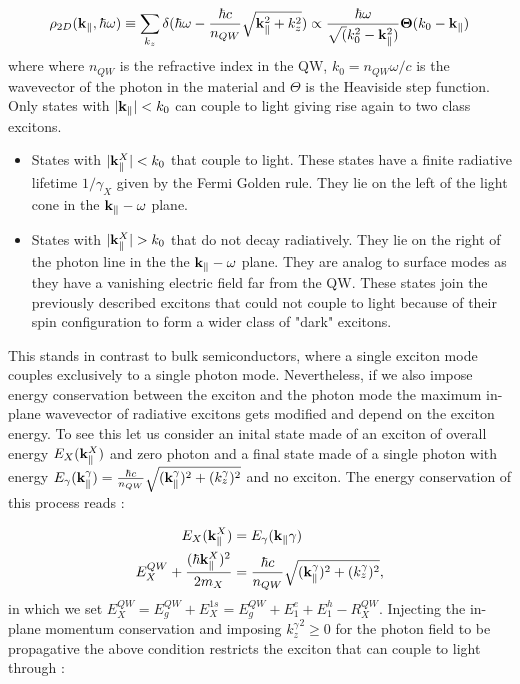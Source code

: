\begin{equation}
    \rho_{2D}(\mathbf{k}_\parallel, \hbar \omega) \equiv \sum_{k_z}\delta(\hbar\omega - \dfrac{\hbar c}{n_{QW}} \sqrt{\mathbf{k}_\parallel^2+ k_z^2})\propto \dfrac{\hbar\omega}{\sqrt(k_0^2-\mathbf{k}_\parallel^2)}\mathbf{\Theta}(k_0-\mathbf{k}_\parallel)
    \label{eq:2D_dos}
\end{equation}
where where $n_{QW}$ is the refractive index in the QW, $k_0 = n_{QW}\omega/c$ is the wavevector of the photon in the material and $\Theta$ is the Heaviside step function. 
Only states with $|\mathbf{k}_\parallel|<k_0$ can couple to light giving rise again to two class excitons.
\begin{itemize}
    \item States with $|\mathbf{k}_\parallel^X|<k_0$ that couple to light. These states have a finite radiative lifetime $1/\gamma_X$ given by the Fermi Golden rule. They lie on the left of the
    light cone in the $\mathbf{k}_\parallel-\omega$ plane.
    \item States with $|\kpar^X|>k_0$ that do not decay radiatively. They lie on the right of the photon line in the the $\mathbf{k}_\parallel-\omega$ plane.  They are analog to surface
    modes as they have a vanishing electric field far from the QW. These states join the previously described excitons that could not couple to light because of their spin configuration to form
    a wider class of "dark" excitons.
\end{itemize}
This stands in contrast to bulk semiconductors, where a single exciton mode couples exclusively to a single photon mode.
Nevertheless, if we also 
impose energy conservation between the exciton and the photon mode the maximum in-plane wavevector of radiative excitons gets modified and depend on the exciton energy.
To see this let us consider an inital state made of an exciton of overall energy $E_X(\mathbf{k}_\parallel^X)$ and zero photon and a final state made of a single photon with energy $E_\gamma(\mathbf{k}_\parallel^{\gamma})= \frac{\hbar c}{n_{QW}} \sqrt{(\mathbf{k}_\parallel^\gamma)^2+ (k_z^\gamma)^2}$ and no exciton.
The energy conservation of this process reads :

\begin{subequations}
    \begin{align}
    E_X(\mathbf{k}_\parallel^X)&= E_\gamma(\mathbf{k}_\parallel{\gamma}) \\
    E_X^{QW} + \dfrac{(\hbar\mathbf{k}_\parallel^X)^2}{2m_X}  &= \dfrac{\hbar c}{n_{QW}} \sqrt{(\mathbf{k}_\parallel^\gamma)^2+ (k_z^\gamma)^2},
    \end{align}
    \label{eq:energy_conservation}
\end{subequations}
in which we set $E_X^{QW} = E_g^{QW}+ E_X^{1s}= E_g^{QW} + E_1^{e} + E_1^{h}-R_X^{QW}$. Injecting the in-plane momentum 
conservation and imposing ${k_z^\gamma}^2 \geq 0$ for the photon field to be propagative the above condition restricts the exciton that can couple to light through :

